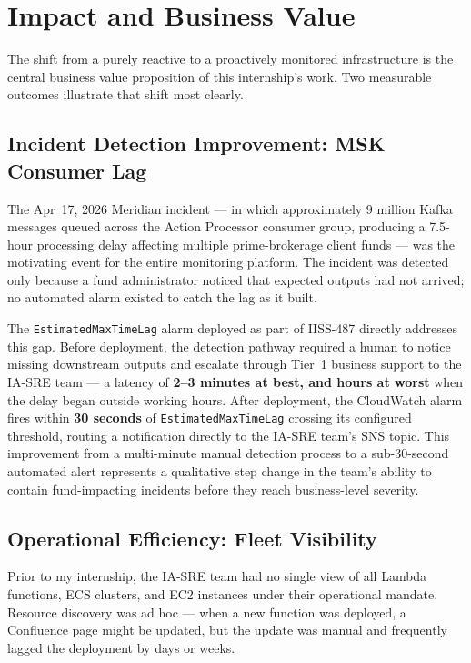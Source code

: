 \section{Impact and Business Value}
\label{sec:impact_business_value}

The shift from a purely reactive to a proactively monitored infrastructure
is the central business value proposition of this internship's work. Two
measurable outcomes illustrate that shift most clearly.

\subsection{Incident Detection Improvement: MSK Consumer Lag}

The Apr~17, 2026 Meridian incident --- in which approximately 9 million
Kafka messages queued across the Action Processor consumer group, producing
a 7.5-hour processing delay affecting multiple prime-brokerage client funds ---
was the motivating event for the entire monitoring platform. The incident was
detected only because a fund administrator noticed that expected outputs had
not arrived; no automated alarm existed to catch the lag as it built.

The \texttt{EstimatedMaxTimeLag} alarm deployed as part of IISS-487 directly
addresses this gap. Before deployment, the detection pathway required a human
to notice missing downstream outputs and escalate through Tier~1 business
support to the IA-SRE team --- a latency of \textbf{2--3 minutes at best,
and hours at worst} when the delay began outside working hours. After
deployment, the CloudWatch alarm fires within \textbf{30 seconds} of
\texttt{EstimatedMaxTimeLag} crossing its configured threshold, routing a
notification directly to the IA-SRE team's SNS topic. This improvement from a
multi-minute manual detection process to a sub-30-second automated alert
represents a qualitative step change in the team's ability to contain
fund-impacting incidents before they reach business-level severity.

\subsection{Operational Efficiency: Fleet Visibility}

Prior to my internship, the IA-SRE team had no single view of all Lambda
functions, ECS clusters, and EC2 instances under their operational mandate.
Resource discovery was ad hoc --- when a new function was deployed, a
Confluence page might be updated, but the update was manual and frequently
lagged the deployment by days or weeks.


